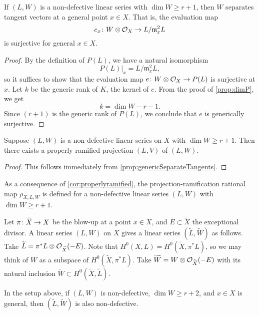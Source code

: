 \begin{proposition}
  \label{prop:genericSeparateTangents}
  If $(L, W)$ is a non-defective linear series with $\dim W \geq r+1$, then $W$ separates tangent vectors at a general point $x \in X$.
  That is, the evaluation map
  \[e_{x}{\colon} W \otimes \mathcal O_X \to L/\mathfrak m_x^2 L\]
  is surjective for general $x \in X$.
\end{proposition}
\begin{proof}
  By the definition of $P(L)$, we have a natural isomorphism
  \[ P(L)|_x = L/\mathfrak m_x^2 L,\]
  so it suffices to show that the evaluation map $e {\colon} W \otimes \mathcal O_X \to P(L)$
  is surjective at $x$.
  Let $k$ be the generic rank of $K$, the kernel of $e$.
  From the proof of \autoref{prop:dimP}, we get
  \[  k = \dim W - r - 1.\]
  Since $(r+1)$ is the generic rank of $P(L)$, we conclude that $e$ is generically surjective.
\end{proof}
\begin{corollary}\label{cor:properlyramified}
  Suppose $(L, W)$ is a non-defective linear series on $X$ with $\dim W \geq r+1$.
  Then there exists a properly ramified projection $(L,V)$ of $(L, W)$.
\end{corollary}
\begin{proof}
  This follows immediately from \autoref{prop:genericSeparateTangents}.
\end{proof}
As a consequence of \autoref{cor:properlyramified}, the projection-ramification rational map $\rho_{X,L, W}$ is defined for a non-defective linear series $(L, W)$ with $\dim W \geq r+1$.

Let $\pi {\colon} \widetilde X \to X$ be the blow-up at a point $x \in X$, and $E \subset \widetilde X$ the exceptional divisor.
A linear series $(L, W)$ on $X$ gives a linear series $(\widetilde L, \widetilde W)$ as follows.
Take $\widetilde L = \pi^* L \otimes \mathcal O_{\widetilde X}(-E)$.
Note that $H^0(X, L) = H^0(\widetilde X, \pi^*L)$, so we may think of $W$ as a subspace of $H^0(\widetilde X, \pi^*L)$.
Take $\widetilde W = W \otimes \mathcal O_{\widetilde X}(-E)$ with its natural inclusion $\widetilde W \subset H^0(\widetilde X, \widetilde L)$.
\begin{proposition}
  \label{prop:blowuppoint}
  In the setup above, if $(L, W)$ is non-defective, $\dim W \geq r+2$, and $x \in X$ is general, then $(\widetilde L, \widetilde W)$ is also non-defective.
\end{proposition}

